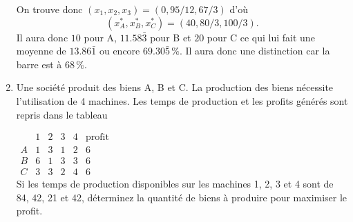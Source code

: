 \begin{enumerate}
\begin{solution}
      On trouve donc $(x_1,x_2,x_3) = (0,95/12,67/3)$ d'où
      \[ (x_A^*,x_B^*,x_C^*) = (40,80/3,100/3). \]
      Il aura donc $10$ pour A, $11.58\bar{3}$ pour B et $20$ pour C
      ce qui lui fait une moyenne de $13.86\bar{1}$ ou encore
      $69.30\bar{5}\,\%$.
      Il aura donc une distinction car la barre est à $68\,\%$.
    \end{solution}

  \item Une société produit des biens A, B et C.
    La production des biens nécessite l'utilisation de 4 machines.
    Les temps de production et les profits générés sont repris dans le tableau

    $
    \begin{array}{l|llll|l}
      & 1 & 2 & 3 & 4 & \mbox{profit}\\
      \hline
      A & 1 & 3 & 1 & 2 & 6\\
      B & 6 & 1 & 3 & 3 & 6\\
      C & 3 & 3 & 2 & 4 & 6
    \end{array}
    $
    \\

    Si les temps de production disponibles sur les machines 1, 2, 3 et 4  sont de 84, 42, 21 et 42,
    déterminez la quantité de biens à produire pour maximiser le profit.


\end{enumerate}
